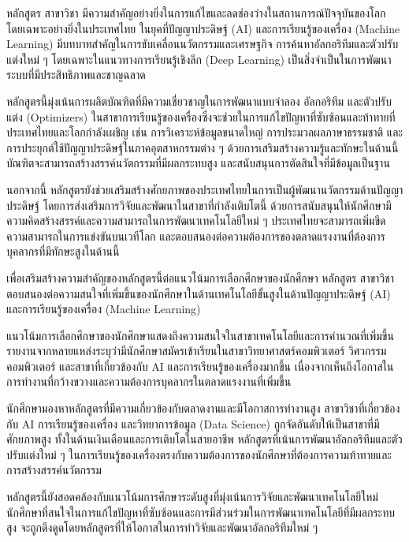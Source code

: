 หลักสูตร\thdegree{} สาขาวิชา\thdegreebranch{} มีความสำคัญอย่างยิ่งในการแก้ไขและลดช่องว่างในสถานการณ์ปัจจุบันของโลก โดยเฉพาะอย่างยิ่งในประเทศไทย ในยุคที่ปัญญาประดิษฐ์ (AI) และการเรียนรู้ของเครื่อง (Machine Learning) มีบทบาทสำคัญในการขับเคลื่อนนวัตกรรมและเศรษฐกิจ การค้นหาอัลกอริทึมและตัวปรับแต่งใหม่ ๆ โดยเฉพาะในแนวทางการเรียนรู้เชิงลึก (Deep Learning) เป็นสิ่งจำเป็นในการพัฒนาระบบที่มีประสิทธิภาพและชาญฉลาด

หลักสูตรนี้มุ่งเน้นการผลิตบัณฑิตที่มีความเชี่ยวชาญในการพัฒนาแบบจำลอง อัลกอริทึม และตัวปรับแต่ง (Optimizers) ในสาขาการเรียนรู้ของเครื่องซึ่งจะช่วยในการแก้ไขปัญหาที่ซับซ้อนและท้าทายที่ประเทศไทยและโลกกำลังเผชิญ เช่น การวิเคราะห์ข้อมูลขนาดใหญ่ การประมวลผลภาษาธรรมชาติ และการประยุกต์ใช้ปัญญาประดิษฐ์ในภาคอุตสาหกรรมต่าง ๆ ด้วยการเสริมสร้างความรู้และทักษะในด้านนี้ บัณฑิตจะสามารถสร้างสรรค์นวัตกรรมที่มีผลกระทบสูง และสนับสนุนการตัดสินใจที่มีข้อมูลเป็นฐาน

นอกจากนี้ หลักสูตรยังช่วยเสริมสร้างศักยภาพของประเทศไทยในการเป็นผู้พัฒนานวัตกรรมด้านปัญญาประดิษฐ์ โดยการส่งเสริมการวิจัยและพัฒนาในสาขาที่กำลังเติบโตนี้ ด้วยการสนับสนุนให้นักศึกษามีความคิดสร้างสรรค์และความสามารถในการพัฒนาเทคโนโลยีใหม่ ๆ ประเทศไทยจะสามารถเพิ่มขีดความสามารถในการแข่งขันบนเวทีโลก และตอบสนองต่อความต้องการของตลาดแรงงานที่ต้องการบุคลากรที่มีทักษะสูงในด้านนี้

เพื่อเสริมสร้างความสำคัญของหลักสูตรนี้ต่อแนวโน้มการเลือกศึกษาของนักศึกษา หลักสูตร\thdegree{} สาขาวิชา\thdegreebranch{} ตอบสนองต่อความสนใจที่เพิ่มขึ้นของนักศึกษาในด้านเทคโนโลยีขั้นสูงในด้านปัญญาประดิษฐ์ (AI) และการเรียนรู้ของเครื่อง (Machine Learning)

แนวโน้มการเลือกศึกษาของนักศึกษาแสดงถึงความสนใจในสาขาเทคโนโลยีและการคำนวณที่เพิ่มขึ้น รายงานจากหลายแหล่งระบุว่ามีนักศึกษาสมัครเข้าเรียนในสาขาวิทยาศาสตร์คอมพิวเตอร์ วิศวกรรมคอมพิวเตอร์ และสาขาที่เกี่ยวข้องกับ AI และการเรียนรู้ของเครื่องมากขึ้น เนื่องจากเห็นถึงโอกาสในการทำงานที่กว้างขวางและความต้องการบุคลากรในตลาดแรงงานที่เพิ่มขึ้น

นักศึกษามองหาหลักสูตรที่มีความเกี่ยวข้องกับตลาดงานและมีโอกาสการทำงานสูง สาขาวิชาที่เกี่ยวข้องกับ AI การเรียนรู้ของเครื่อง และวิทยาการข้อมูล (Data Science) ถูกจัดอันดับให้เป็นสาขาที่มีศักยภาพสูง ทั้งในด้านเงินเดือนและการเติบโตในสายอาชีพ หลักสูตรที่เน้นการพัฒนาอัลกอริทึมและตัวปรับแต่งใหม่ ๆ ในการเรียนรู้ของเครื่องตรงกับความต้องการของนักศึกษาที่ต้องการความท้าทายและการสร้างสรรค์นวัตกรรม

หลักสูตรนี้ยังสอดคล้องกับแนวโน้มการศึกษาระดับสูงที่มุ่งเน้นการวิจัยและพัฒนาเทคโนโลยีใหม่ นักศึกษาที่สนใจในการแก้ไขปัญหาที่ซับซ้อนและการมีส่วนร่วมในการพัฒนาเทคโนโลยีที่มีผลกระทบสูง จะถูกดึงดูดโดยหลักสูตรที่ให้โอกาสในการทำวิจัยและพัฒนาอัลกอริทึมใหม่ ๆ

